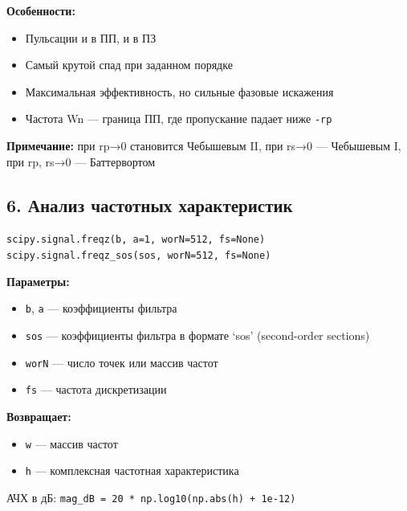 \documentclass[12pt,a4paper,openany]{book}
\providecommand{\tightlist}{\setlength{\itemsep}{0pt}\setlength{\parskip}{0pt}}
\begin{document}
\textbf{Особенности:}

\begin{itemize}
\tightlist
\item
  Пульсации и в ПП, и в ПЗ
\item
  Самый крутой спад при заданном порядке
\item
  Максимальная эффективность, но сильные фазовые искажения
\item
  Частота Wn --- граница ПП, где пропускание падает ниже \texttt{-rp}
\end{itemize}

\textbf{Примечание:} при rp→0 становится Чебышевым II, при rs→0 --- Чебышевым I, при rp, rs→0 --- Баттервортом

\subsection*{6. Анализ частотных характеристик}

\texttt{scipy.\allowbreak{}signal.\allowbreak{}freqz(\allowbreak{}b,\allowbreak{}\ a=\allowbreak{}1,\allowbreak{}\ worN=\allowbreak{}512,\allowbreak{}\ fs=\allowbreak{}None)}
\texttt{scipy.\allowbreak{}signal.\allowbreak{}freqz\_\allowbreak{}sos(\allowbreak{}sos,\allowbreak{}\ worN=\allowbreak{}512,\allowbreak{}\ fs=\allowbreak{}None)}

\textbf{Параметры:}

\begin{itemize}
\tightlist
\item
  \texttt{b}, \texttt{a} --- коэффициенты фильтра
\item
  \texttt{sos} --- коэффициенты фильтра в формате `sos' (second-order sections)
\item
  \texttt{worN} --- число точек или массив частот
\item
  \texttt{fs} --- частота дискретизации
\end{itemize}

\textbf{Возвращает:}

\begin{itemize}
\tightlist
\item
  \texttt{w} --- массив частот
\item
  \texttt{h} --- комплексная частотная характеристика
\end{itemize}

АЧХ в дБ: \texttt{mag\_\allowbreak{}dB\ =\allowbreak{}\ 20\ *\ np.\allowbreak{}log10(\allowbreak{}np.\allowbreak{}abs(\allowbreak{}h)\ +\ 1e-12)}
\end{document}
